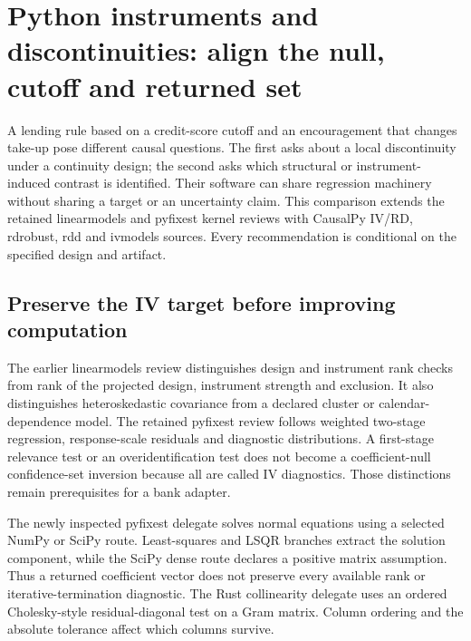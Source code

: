 \section{Python instruments and discontinuities: align the null, cutoff and returned set}
\label{sec:exec25-python-iv-rd}

A lending rule based on a credit-score cutoff and an encouragement that
changes take-up pose different causal questions. The first asks about a
local discontinuity under a continuity design; the second asks which
structural or instrument-induced contrast is identified. Their software
can share regression machinery without sharing a target or an uncertainty
claim. This comparison extends the retained linearmodels and pyfixest
kernel reviews with CausalPy IV/RD, rdrobust, rdd and ivmodels sources.
Every recommendation is conditional on the specified design and artifact.
\citep{exec25_pyrdiv_choice,exec22_pyiv_kernels_linearmodels,
exec22_pyiv_kernels_pyfixest}

\subsection{Preserve the IV target before improving computation}
The earlier linearmodels review distinguishes design and instrument rank
checks from rank of the projected design, instrument strength and exclusion.
It also distinguishes heteroskedastic covariance from a declared cluster or
calendar-dependence model. The retained pyfixest review follows weighted
two-stage regression, response-scale residuals and diagnostic distributions.
A first-stage relevance test or an overidentification test does not become
a coefficient-null confidence-set inversion because all are called IV
diagnostics. Those distinctions remain prerequisites for a bank adapter.
\citep{exec22_pyiv_kernels_linearmodels,exec22_pyiv_kernels_pyfixest,
exec22_pyiv_reference}

The newly inspected pyfixest delegate solves normal equations using a
selected NumPy or SciPy route. Least-squares and LSQR branches extract
the solution component, while the SciPy dense route declares a positive
matrix assumption. Thus a returned coefficient vector does not preserve
every available rank or iterative-termination diagnostic. The Rust
collinearity delegate uses an ordered Cholesky-style residual-diagonal
test on a Gram matrix. Column ordering and the absolute tolerance affect
which columns survive.~\citep{exec25_pyrdiv_pyfixest}

